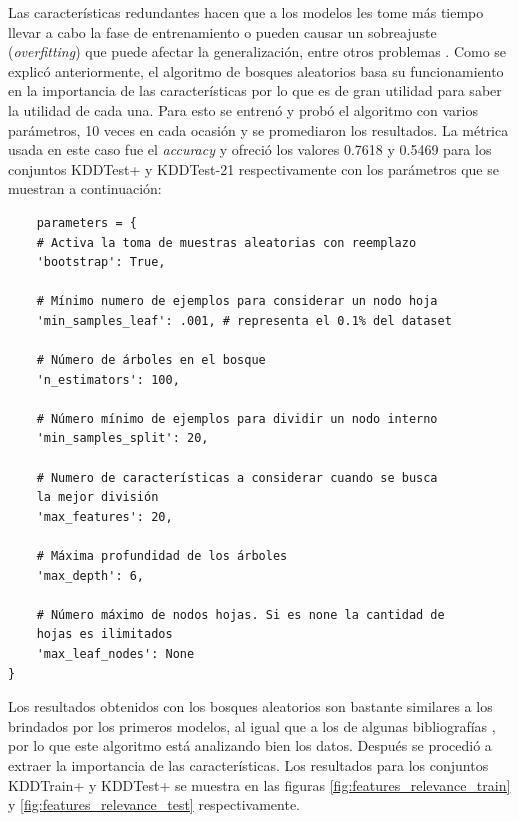 Las características redundantes hacen que a los modelos les tome más tiempo llevar a cabo la fase de entrenamiento o pueden causar un sobreajuste (\textit{overfitting}) que puede afectar la generalización, entre otros problemas \cite{tuv2009feature}. Como se explicó anteriormente, el algoritmo de bosques aleatorios basa su funcionamiento en la importancia de las características por lo que es de gran utilidad para saber la utilidad de cada una. Para esto se entrenó y probó el algoritmo con varios parámetros, 10 veces en cada ocasión y se promediaron los resultados. La métrica usada en este caso fue el \textit{accuracy} y ofreció los valores 0.7618 y 0.5469 para los conjuntos KDDTest+ y KDDTest-21 respectivamente con los parámetros que se muestran a continuación:

\begin{verbatim}
    parameters = {
    # Activa la toma de muestras aleatorias con reemplazo
    'bootstrap': True,

    # Mínimo numero de ejemplos para considerar un nodo hoja
    'min_samples_leaf': .001, # representa el 0.1% del dataset

    # Número de árboles en el bosque
    'n_estimators': 100,

    # Número mínimo de ejemplos para dividir un nodo interno
    'min_samples_split': 20,

    # Numero de características a considerar cuando se busca 
    la mejor división
    'max_features': 20,

    # Máxima profundidad de los árboles
    'max_depth': 6,

    # Número máximo de nodos hojas. Si es none la cantidad de 
    hojas es ilimitados
    'max_leaf_nodes': None
}
\end{verbatim}

Los resultados obtenidos con los bosques aleatorios son bastante similares a los brindados por los primeros modelos, al igual que a los de algunas bibliografías \cite{abualkibash2019machine}, por lo que este algoritmo está analizando bien los datos. Después se procedió a extraer la importancia de las características. Los resultados para los conjuntos KDDTrain+ y KDDTest+ se muestra en las figuras \ref{fig:features_relevance_train} y \ref{fig:features_relevance_test} respectivamente.

